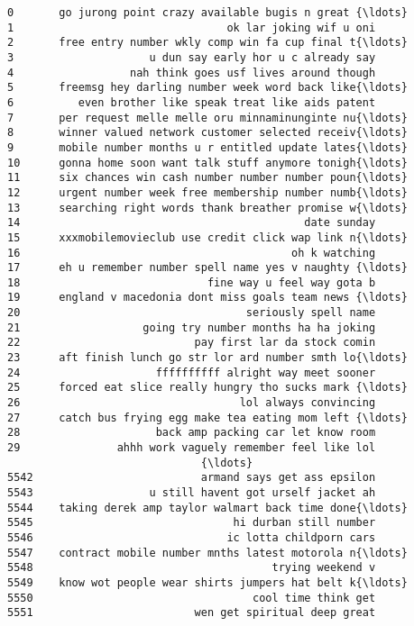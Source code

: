 \documentclass[11pt]{article}
\begin{document}
    \begin{Verbatim}[commandchars=\\\{\}]
0       go jurong point crazy available bugis n great {\ldots}
1                                 ok lar joking wif u oni
2       free entry number wkly comp win fa cup final t{\ldots}
3                     u dun say early hor u c already say
4                  nah think goes usf lives around though
5       freemsg hey darling number week word back like{\ldots}
6          even brother like speak treat like aids patent
7       per request melle melle oru minnaminunginte nu{\ldots}
8       winner valued network customer selected receiv{\ldots}
9       mobile number months u r entitled update lates{\ldots}
10      gonna home soon want talk stuff anymore tonigh{\ldots}
11      six chances win cash number number number poun{\ldots}
12      urgent number week free membership number numb{\ldots}
13      searching right words thank breather promise w{\ldots}
14                                            date sunday
15      xxxmobilemovieclub use credit click wap link n{\ldots}
16                                          oh k watching
17      eh u remember number spell name yes v naughty {\ldots}
18                             fine way u feel way gota b
19      england v macedonia dont miss goals team news {\ldots}
20                                   seriously spell name
21                   going try number months ha ha joking
22                           pay first lar da stock comin
23      aft finish lunch go str lor ard number smth lo{\ldots}
24                     ffffffffff alright way meet sooner
25      forced eat slice really hungry tho sucks mark {\ldots}
26                                  lol always convincing
27      catch bus frying egg make tea eating mom left {\ldots}
28                     back amp packing car let know room
29               ahhh work vaguely remember feel like lol
                              {\ldots}                        
5542                          armand says get ass epsilon
5543                  u still havent got urself jacket ah
5544    taking derek amp taylor walmart back time done{\ldots}
5545                               hi durban still number
5546                              ic lotta childporn cars
5547    contract mobile number mnths latest motorola n{\ldots}
5548                                     trying weekend v
5549    know wot people wear shirts jumpers hat belt k{\ldots}
5550                                  cool time think get
5551                         wen get spiritual deep great

\end{Verbatim}
\end{document}
